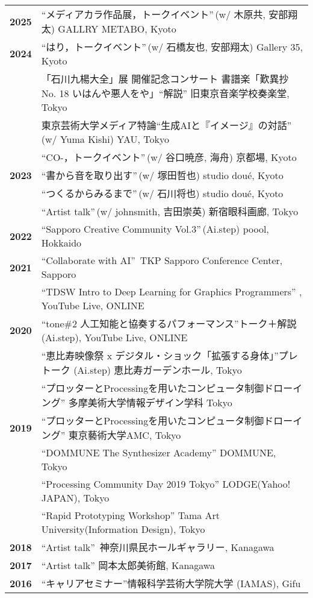 \documentclass[8pt,a4paper]{article}
\begin{document}
\begin{tabular}{@{}p{1.2cm}@{\hspace{0.5cm}}p{14cm}@{}}
\textbf{2025} & ``メディアカラ作品展，トークイベント''\,(w/ 木原共, 安部翔太) GALLRY METABO, Kyoto \\[0.2em]
\textbf{2024} & ``はり，トークイベント''\,(w/ 石橋友也, 安部翔太) Gallery 35, Kyoto \\
& 「石川九楊大全」展 開催記念コンサート 書譜楽「歎異抄 No. 18 いはんや悪人をや」``解説'' 旧東京音楽学校奏楽堂, Tokyo \\
& 東京芸術大学メディア特論``生成AIと『イメージ』の対話''\,(w/ Yuma Kishi) YAU, Tokyo \\
& ``CO-，トークイベント''\,(w/ 谷口暁彦, 海舟) 京都場, Kyoto \\[0.2em]
\textbf{2023} & ``書から音を取り出す''\,(w/ 塚田哲也) studio doué, Kyoto \\
& ``つくるからみるまで''\,(w/ 石川将也) studio doué, Kyoto \\
& ``Artist talk''\,(w/ johnsmith, 吉田崇英) 新宿眼科画廊, Tokyo \\[0.2em]
\textbf{2022} & ``Sapporo Creative Community Vol.3''\,(Ai.step) poool, Hokkaido \\[0.2em]
\textbf{2021} & ``Collaborate with AI''\, TKP Sapporo Conference Center, Sapporo \\
& ``TDSW Intro to Deep Learning for Graphics Programmers'' , YouTube Live, ONLINE \\[0.2em]
\textbf{2020} & ``tone\#2 人工知能と協奏するパフォーマンス''トーク＋解説 (Ai.step), YouTube Live, ONLINE \\
& ``恵比寿映像祭 x デジタル・ショック「拡張する身体」''プレトーク (Ai.step) 恵比寿ガーデンホール, Tokyo \\
& ``プロッターとProcessingを用いたコンピュータ制御ドローイング'' 多摩美術大学情報デザイン学科 Tokyo \\[0.2em]
\textbf{2019} & ``プロッターとProcessingを用いたコンピュータ制御ドローイング'' 東京藝術大学AMC, Tokyo \\
& ``DOMMUNE The Synthesizer Academy'' DOMMUNE, Tokyo \\
& ``Processing Community Day 2019 Tokyo'' LODGE(Yahoo! JAPAN), Tokyo \\
& ``Rapid Prototyping Workshop'' Tama Art University(Information Design), Tokyo \\[0.2em]
\textbf{2018} & ``Artist talk''\, 神奈川県民ホールギャラリー, Kanagawa \\[0.2em]
\textbf{2017} & ``Artist talk'' 岡本太郎美術館, Kanagawa \\[0.2em]
\textbf{2016} & ``キャリアセミナー''情報科学芸術大学院大学 (IAMAS), Gifu \\
\end{tabular}
\end{document}

